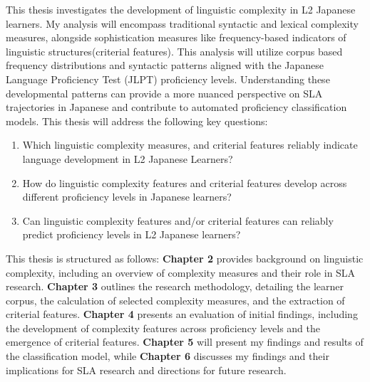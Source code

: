 This thesis investigates the development of linguistic complexity in L2 Japanese learners. My analysis will
encompass traditional syntactic and lexical complexity measures, alongside sophistication measures like
frequency-based indicators of linguistic structures(criterial features). This analysis will utilize corpus based
frequency distributions
and syntactic patterns aligned with the Japanese Language Proficiency Test (JLPT) proficiency levels.
Understanding these developmental patterns can provide a more nuanced
perspective on SLA trajectories in Japanese and contribute to automated proficiency classification models. This
thesis will address the following key questions:
\begin{enumerate}
    \item Which linguistic complexity measures, and criterial features reliably indicate language development in L2
    Japanese Learners?
    \item How do linguistic complexity features and criterial features develop across different
    proficiency
    levels in Japanese
    learners?
    \item Can linguistic complexity features and/or criterial features can reliably predict proficiency
    levels in L2 Japanese
    learners?
\end{enumerate}

This thesis is structured as follows: \textbf{Chapter 2} provides background on linguistic complexity, including an
overview of complexity measures and their role in SLA research.
\textbf{Chapter 3} outlines the research methodology, detailing the learner corpus, the calculation of selected
complexity measures, and the extraction of criterial features.
 \textbf{Chapter 4} presents an evaluation of initial findings, including the development of complexity features across proficiency levels and the emergence of criterial features.
\textbf{Chapter 5 }will present my findings and results of the classification model, while \textbf{Chapter 6}
discusses my findings and their implications for SLA research and directions for
future research.
